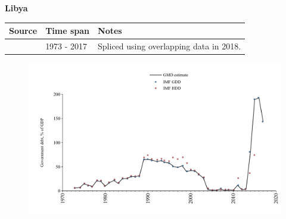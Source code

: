 \documentclass[12pt,a4paper,landscape]{article}
\begin{document}
\begin{adjustbox}{max totalsize={\paperwidth}{\paperheight},center}
\begin{minipage}[t][\textheight][t]{\textwidth}
\vspace*{0.5cm}
{}
\begin{center}
{\Large\bfseries Libya}
\end{center}
\vspace{0.5cm}
\begin{table}[H]
\centering
\small
\begin{tabular}{|l|l|l|}
\hline
\textbf{Source} & \textbf{Time span} & \textbf{Notes} \\
\hline
\rowcolor{white}\cite{IMF_GDD}& 1973 - 2017 &Spliced using overlapping data in 2018.\\
\hline
\end{tabular}
\end{table}
\begin{figure}[H]
\centering
\includegraphics[width=\textwidth,height=0.6\textheight,keepaspectratio]{graphs/LBY_govdebt_GDP.pdf}
\end{figure}
\end{minipage}
\end{adjustbox}
\end{document}
